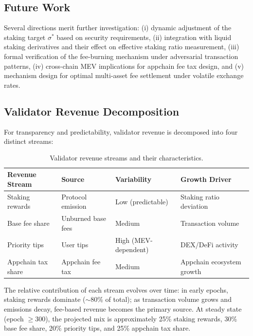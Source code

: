 \documentclass[11pt,a4paper]{article}
\begin{document}
\subsection{Future Work}

Several directions merit further investigation: (i) dynamic adjustment of the staking target $\sigma^*$ based on security requirements, (ii) integration with liquid staking derivatives and their effect on effective staking ratio measurement, (iii) formal verification of the fee-burning mechanism under adversarial transaction patterns, (iv) cross-chain MEV implications for appchain fee tax design, and (v) mechanism design for optimal multi-asset fee settlement under volatile exchange rates.

\subsection{Validator Revenue Decomposition}

For transparency and predictability, validator revenue is decomposed into four distinct streams:

\begin{table}[H]
\centering
\caption{Validator revenue streams and their characteristics.}
\label{tab:revenuestreams}
\begin{tabular}{p{3cm}p{2.5cm}p{2.5cm}p{3cm}}
\toprule
\textbf{Revenue Stream} & \textbf{Source} & \textbf{Variability} & \textbf{Growth Driver} \\
\midrule
Staking rewards & Protocol emission & Low (predictable) & Staking ratio deviation \\
Base fee share & Unburned base fees & Medium & Transaction volume \\
Priority tips & User tips & High (MEV-dependent) & DEX/DeFi activity \\
Appchain tax share & Appchain fee tax & Medium & Appchain ecosystem growth \\
\bottomrule
\end{tabular}
\end{table}

The relative contribution of each stream evolves over time: in early epochs, staking rewards dominate ($\sim$80\% of total); as transaction volume grows and emissions decay, fee-based revenue becomes the primary source. At steady state (epoch $\geq 300$), the projected mix is approximately 25\% staking rewards, 30\% base fee share, 20\% priority tips, and 25\% appchain tax share.
\end{document}
